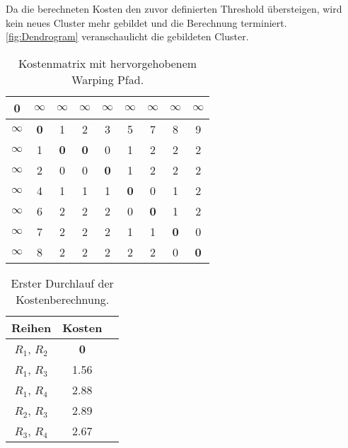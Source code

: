 Da die berechneten Kosten den zuvor definierten Threshold übersteigen,
wird kein neues Cluster mehr gebildet und die Berechnung terminiert.
\autoref{fig:Dendrogram} veranschaulicht die gebildeten Cluster.
\begin{table}[ht]
    \begin{center}
        \begin{tabular}{ |c||c|c|c|c|c|c|c|c| } 
         \hline
         \textbf{0} & $\infty$ & $\infty$ & $\infty$
         & $\infty$ & $\infty$ & $\infty$ & $\infty$ & $\infty$ \\
         \hline
         \hline
         $\infty$ &\textbf{0} & 1 & 2 & 3 & 5 & 7 & 8 & 9 \\
         \hline
         $\infty$ & 1 & \textbf{0} & \textbf{0} & 0 & 1 & 2 & 2 & 2 \\
         \hline
         $\infty$ & 2 & 0 & 0 & \textbf{0} & 1 & 2 & 2 & 2 \\
         \hline
         $\infty$ & 4 & 1 & 1 & 1 & \textbf{0} & 0 & 1 & 2 \\
         \hline
         $\infty$ & 6 & 2 & 2 & 2 & 0 & \textbf{0} & 1 & 2 \\
         \hline
         $\infty$ & 7 & 2 & 2 & 2 & 1 & 1 & \textbf{0} & 0 \\
         \hline
         $\infty$ & 8 & 2 & 2 & 2 & 2 & 2 & 0 & \textbf{0} \\
         \hline
        \end{tabular}
        \caption{Kostenmatrix mit hervorgehobenem Warping Pfad.}
        \label{tbl:ExampleMatrix}
    \end{center}
\end{table}
\begin{table}[ht]
    \begin{center}
        \begin{tabular}{ |c|c|c| } 
         \hline
         Reihen & Kosten \\
         \hline \hline
         $R_{1}$, $R_{2}$ & \textbf{0} \\
         \hline
         $R_{1}$, $R_{3}$ & 1.56 \\
         \hline
         $R_{1}$, $R_{4}$ & 2.88 \\
         \hline
         $R_{2}$, $R_{3}$ & 2.89 \\
         \hline
         $R_{3}$, $R_{4}$ & 2.67 \\
         \hline
        \end{tabular}
        \caption{Erster Durchlauf der Kostenberechnung.}
        \label{tbl:ExampleCost1}
    \end{center}
\end{table}
